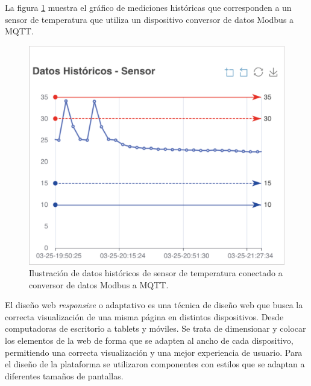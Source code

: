 \newpage


La figura \ref{fig:device-grafica} muestra el gráfico de mediciones históricas que corresponden a un sensor de temperatura que utiliza un dispositivo conversor de datos Modbus a MQTT.


\begin{figure}[htpb]
	\centering
	\includegraphics[scale=.65]{./Figures/device-grafica.png}
	\caption[Componente gráfico de echarts]{Ilustración de datos históricos de sensor de temperatura conectado a conversor de datos Modbus a MQTT.}
	\label{fig:device-grafica}
\end{figure}


El diseño web \textit{responsive} o adaptativo es una técnica de diseño web que busca la correcta visualización de una misma página en distintos dispositivos. Desde computadoras de escritorio a tablets y móviles.  Se trata de dimensionar y colocar los elementos de la web de forma que se adapten al ancho de cada dispositivo, permitiendo una correcta visualización y una mejor experiencia de usuario.  Para el diseño de la plataforma se utilizaron componentes con estilos que se adaptan a diferentes tamaños de pantallas. 


